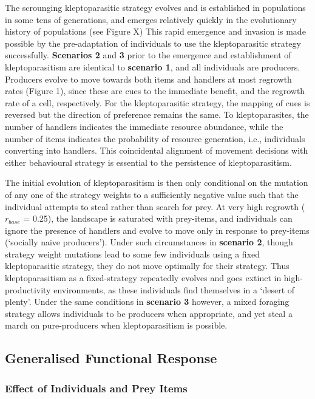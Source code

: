 \documentclass[11pt]{article}
\begin{document}
The scrounging kleptoparasitic strategy evolves and is established in populations in some tens of generations, and emerges relatively quickly in the evolutionary history of populations (see Figure X)
This rapid emergence and invasion is made possible by the pre-adaptation of individuals to use the kleptoparasitic strategy successfully.
\textbf{Scenarios 2} and \textbf{3} prior to the emergence and establishment of kleptoparasitism are identical to \textbf{scenario 1}, and all individuals are producers.
Producers evolve to move towards both items and handlers at most regrowth rates (Figure 1), since these are cues to the immediate benefit, and the regrowth rate of a cell, respectively.
For the kleptoparasitic strategy, the mapping of cues is reversed but the direction of preference remains the same.
To kleptoparasites, the number of handlers indicates the immediate resource abundance, while the number of items indicates the probability of resource generation, i.e., individuals converting into handlers.
This coincidental alignment of movement decisions with either behavioural strategy is essential to the persistence of kleptoparasitism.

The initial evolution of kleptoparasitism is then only conditional on the mutation of any one of the strategy weights to a sufficiently negative value such that the individual attempts to steal rather than search for prey.
At very high regrowth ($r_{base}$ = 0.25), the landscape is saturated with prey-items, and individuals can ignore the presence of handlers and evolve to move only in response to prey-items (`socially naive producers').
Under such circumstances in \textbf{scenario 2}, though strategy weight mutations lead to some few individuals using a fixed kleptoparasitic strategy, they do not move optimally for their strategy.
Thus kleptoparasitism as a fixed-strategy repeatedly evolves and goes extinct in high-productivity environments, as these individuals find themselves in a `desert of plenty'.
Under the same conditions in \textbf{scenario 3} however, a mixed foraging strategy allows individuals to be producers when appropriate, and yet steal a march on pure-producers when kleptoparasitism is possible.

\subsection*{Generalised Functional Response}

\subsubsection*{Effect of Individuals and Prey Items}
\end{document}
